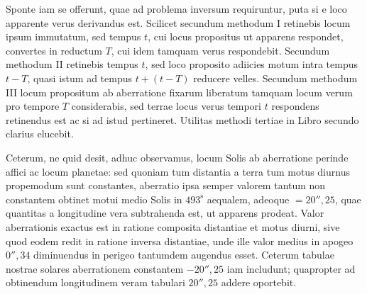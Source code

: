 Sponte iam se offerunt, quae ad problema inversum requiruntur, puta si e loco apparente verus derivandus est. Scilicet secundum methodum I retinebis locum ipsum immutatum, sed tempus $t$, cui locus propositus ut apparens respondet, convertes in reductum $T$, cui idem tamquam verus respondebit. Secundum methodum II retinebis tempus $t$, sed loco proposito adiicies motum intra tempus $t-T$, quasi istum ad tempus $t+(t-T)$ reducere velles. Secundum methodum III locum propositum ab aberratione fixarum liberatum tamquam locum verum pro tempore $T$ considerabis, sed terrae locus verus tempori $t$ respondens retinendus est ac si ad istud pertineret. Utilitas methodi tertiae in Libro secundo clarius elucebit.

Ceterum, ne quid desit, adhuc observamus, locum Solis ab aberratione perinde affici ac locum planetae: sed quoniam tum distantia a terra tum motus diurnus propemodum sunt constantes, aberratio ipsa semper valorem tantum non constantem obtinet motui medio Solis in $493^{\mathrm{s}}$ aequalem, adeoque $=20''{,}25$, quae quantitas a longitudine vera subtrahenda est, ut apparens prodeat. Valor aberrationis exactus est in ratione composita distantiae et motus diurni, sive quod eodem redit in ratione inversa distantiae, unde ille valor medius in apogeo $0''{,}34$ diminuendus in perigeo tantumdem augendus esset. Ceterum tabulae nostrae solares aberrationem constantem $-20''{,}25$ iam includunt; quapropter ad obtinendum longitudinem veram tabulari $20''{,}25$ addere oportebit.

